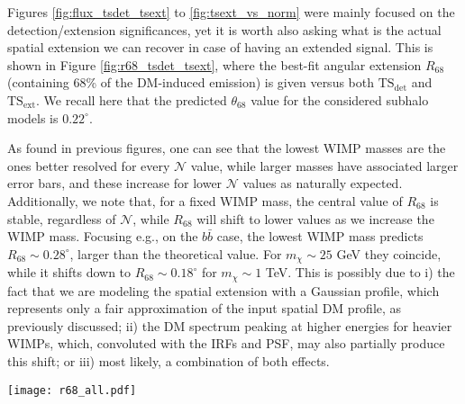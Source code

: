 \documentclass[%
 reprint,
nofootinbib,
 amsmath,amssymb,
 aps,
]{revtex4-2}
\begin{document}
Figures \ref{fig:flux_tsdet_tsext} to \ref{fig:tsext_vs_norm} were mainly focused on the detection/extension significances, yet it is worth also asking what is the actual spatial extension we can recover in case of having an extended signal. This is shown in Figure \ref{fig:r68_tsdet_tsext}, where the best-fit angular extension $R_{68}$ (containing 68\% of the DM-induced emission) is given versus both $\mathrm{TS_{det}}$ and $\mathrm{TS_{ext}}$. We recall here that the predicted $\theta_{68}$ value for the considered subhalo models is $0.22^{\circ}$.

As found in previous figures, one can see that the lowest WIMP masses are the ones better resolved for every $\mathcal{N}$ value, while larger masses have associated larger error bars, and these increase for lower $\mathcal{N}$ values as naturally expected. Additionally, we note that, for a fixed WIMP mass, the central value of $R_{68}$ is stable, regardless of $\mathcal{N}$, while $R_{68}$ will shift to lower values as we increase the WIMP mass. Focusing e.g., on the $b\bar{b}$ case, the lowest WIMP mass predicts $R_{68}\sim0.28^{\circ}$, larger than the theoretical value. For $m_{\chi}\sim 25$ GeV they coincide, while it shifts down to $R_{68}\sim0.18^{\circ}$ for $m_{\chi}\sim 1$ TeV. This is possibly due to i) the fact that we are modeling the spatial extension with a Gaussian profile, which represents only a fair approximation of the input spatial DM profile, as previously discussed; ii) the DM spectrum peaking at higher energies for heavier WIMPs, which, convoluted with the IRFs and PSF, may also partially produce this shift; or iii) most likely, a combination of both effects.


\begin{figure*}[!ht]
\centering
\texttt{[image: r68\_all.pdf]}
\caption{Best-fit extension $R_{68}$ versus the extension ($\mathrm{TS_{ext}}$) and detection ($\mathrm{TS_{det}}$) significance, for the ($b\bar{b}$, $\mathrm{10^4~M_{\odot}}$) and the ($\tau^+\tau^-$, $\mathrm{10^7~M_{\odot}}$) models. Each $R_{68}$ is the average value of the 10 realizations, while their uncertainties are computed via a quadratic sum of the individual realization uncertainties and the $1\sigma$ spread across realizations.}
\label{fig:r68_tsdet_tsext}
\end{figure*}
\end{document}
